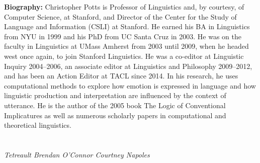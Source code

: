 \vspace{3em}

\vfill{}
\noindent \textbf{Biography:}  Christopher Potts is Professor of Linguistics and, by courtesy, of Computer Science, at Stanford, and Director of the Center for the Study of Language and Information (CSLI) at Stanford. He earned his BA in Linguistics from NYU in 1999 and his PhD from UC Santa Cruz in 2003. He was on the faculty in Linguistics at UMass Amherst from 2003 until 2009, when he headed west once again, to join Stanford Linguistics. He was a co-editor at Linguistic Inquiry 2004–2006, an associate editor at Linguistics and Philosophy 2009–2012, and has been an Action Editor at TACL since 2014. In his research, he uses computational methods to explore how emotion is expressed in language and how linguistic production and interpretation are influenced by the context of utterance. He is the author of the 2005 book The Logic of Conventional Implicatures as well as numerous scholarly papers in computational and theoretical linguistics.

\clearpage{}








%

%

\newpage

\section[Plenary Session: Half Minute Madness A]{}
\bigskip{}
 \hfill \emph{ {Tetreault} {Brendan} {O'Connor} {Courtney} {Napoles} }\par
{}\par
\bigskip{}

